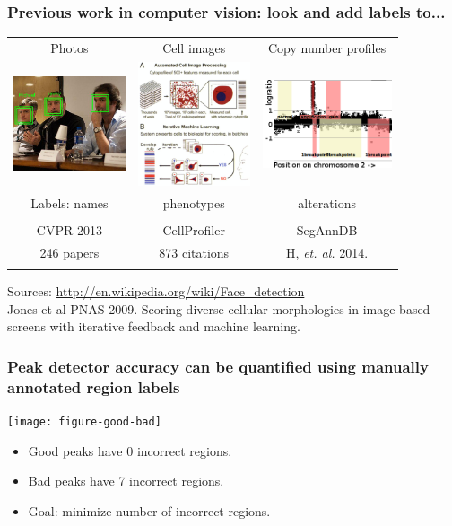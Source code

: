 \documentclass{beamer}
\begin{document}
\begin{frame}
  \frametitle{Previous work in computer vision: look and add labels
    to...}
  \begin{tabular}{ccc}
    Photos & Cell images & Copy number profiles \\
    \includegraphics[width=1.3in]{faces} &
    \includegraphics[width=1.3in]{cellprofiler} &
    \includegraphics[width=1.5in]{regions-axes}\\
    Labels: names & phenotypes & alterations \\ \\
    CVPR 2013 & CellProfiler & SegAnnDB \\
    246 papers & 873 citations & H, \emph{et. al.} 2014. \\
     &
  \end{tabular}
  Sources: \url{http://en.wikipedia.org/wiki/Face_detection}\\
  Jones et al PNAS 2009. Scoring diverse cellular morphologies in
  image-based screens with iterative feedback and machine learning.
\end{frame}

\begin{frame}
  \frametitle{Peak detector accuracy can be quantified using manually
    annotated region labels}
  
  \texttt{[image: figure-good-bad]}

  \begin{itemize}
  \item Good peaks have 0 incorrect regions.
  \item Bad peaks have 7 incorrect regions.
  \item Goal: minimize number of incorrect regions.
  \end{itemize}

\end{frame}
\end{document}
